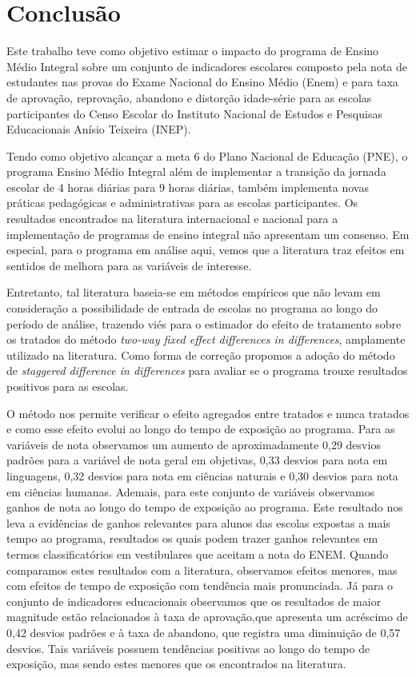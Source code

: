 \documentclass[
        12pt,                           %
        openright,                      %
        oneside,
        a4paper,                        %
        chapter=TITLE,         %
        section=TITLE,         %
        subsection=Title,      %
        english,                        %
        spanish,                        %
        portugues,                      %
        ]{abntex2}
\begin{document}
\chapter*[Conclusão]{Conclusão}
Este trabalho teve como objetivo estimar o impacto do programa de Ensino Médio Integral sobre um conjunto de indicadores escolares composto pela nota de estudantes nas provas do Exame Nacional do Ensino Médio (Enem) e para taxa de aprovação, reprovação, abandono e distorção idade-série para as escolas participantes do Censo Escolar do Instituto Nacional de Estudos e Pesquisas Educacionais Anísio Teixeira (INEP). 

Tendo como objetivo alcançar a meta 6 do Plano Nacional de Educação (PNE), o programa Ensino Médio Integral além de implementar a transição da jornada escolar de 4 horas diárias para 9 horas diárias, também implementa novas práticas pedagógicas e administrativas para as escolas participantes. 
Os resultados encontrados na literatura internacional e nacional para a implementação de programas de ensino integral não apresentam um consenso. Em especial, para o programa em análise aqui, vemos que a literatura traz efeitos em sentidos de melhora para as variáveis de interesse.

Entretanto, tal literatura baseia-se em métodos empíricos que não levam em consideração a possibilidade de entrada de escolas no programa ao longo do período de análise, trazendo viés para o estimador do efeito de tratamento sobre os tratados do método \textit{two-way fixed effect differences in differences}, amplamente utilizado na literatura. Como forma de correção propomos a adoção do método de \textit{staggered difference in differences} para avaliar se o programa trouxe resultados positivos para as escolas.

O método nos permite verificar o efeito agregados entre tratados e nunca tratados e como esse efeito evolui ao longo do tempo de exposição ao programa. Para as variáveis de nota observamos um aumento de aproximadamente 0,29 desvios padrões para a variável de nota geral em objetivas, 0,33 desvios para nota em linguagens, 0,32 desvios para nota em ciências naturais e 0,30 desvios para nota em ciências humanas. Ademais, para este conjunto de variáveis observamos  ganhos de nota ao longo do tempo de exposição ao programa. Este resultado nos leva a evidências de ganhos relevantes para alunos das escolas expostas a mais tempo ao programa, resultados os quais podem trazer ganhos relevantes em termos classificatórios em vestibulares que aceitam a nota do ENEM. Quando comparamos estes resultados com a literatura, observamos efeitos menores, mas com efeitos de tempo de exposição com tendência mais pronunciada. Já para o conjunto de indicadores educacionais observamos que os resultados de maior magnitude estão relacionados à taxa de aprovação,que apresenta um acréscimo de 0,42 desvios padrões e à taxa de abandono, que registra uma diminuição de 0,57 desvios. Tais variáveis possuem tendências positivas ao longo do tempo de exposição, mas sendo estes menores que os encontrados na literatura.
\end{document}
